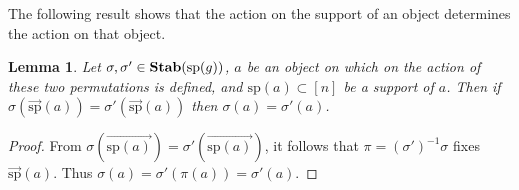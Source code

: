 \documentclass[12pt]{report}
\newtheorem{lem}[thm]{Lemma} \newtheorem{prop}[thm]{Proposition}
\newcommand{\stab}{\text{\textbf{Stab}}}
\newcommand{\sym}{\text{\textbf{Sym}}}
\newcommand{\consp}{\text{sp}}
\newcommand{\spstab}[1]{\stab (\consp (#1))}
\begin{document}

The following result shows that the action on the support of an object
determines the action on that object.

\begin{lem}
  \label{lem:support_determine_action}
  Let $\sigma, \sigma' \in \spstab{g}$, $a$ be an object on which on the action
  of these two permutations is defined, and $\consp(a) \subset [n]$ be a support
  of $a$. Then if $\sigma (\vec{\consp}(a)) = \sigma' (\vec{\consp}(a))$ then
  $\sigma (a) = \sigma' (a)$.
\end{lem}
\begin{proof}
  From $\sigma (\vec{\consp(a)}) = \sigma' (\vec{\consp(a)})$, it follows that
  $\pi = (\sigma')^{-1} \sigma$ fixes $\vec{\consp}(a)$. Thus $\sigma (a) =
  \sigma' (\pi (a)) = \sigma' (a)$.
\end{proof}




\end{document}
